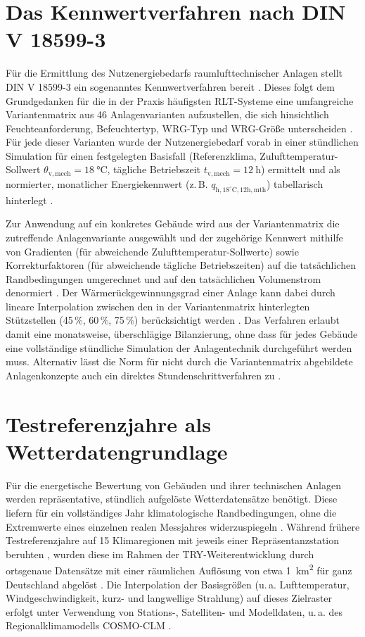 \documentclass{scrreprt}
\begin{document}
\section{Das Kennwertverfahren nach DIN V 18599-3}
Für die Ermittlung des Nutzenergiebedarfs raumlufttechnischer Anlagen
stellt DIN V 18599-3 ein sogenanntes Kennwertverfahren bereit
\parencite{DIN185993}. Dieses folgt dem Grundgedanken für die in der Praxis häufigsten \ac{RLT}-Systeme eine umfangreiche Variantenmatrix aus 46 Anlagenvarianten aufzustellen, die
sich hinsichtlich Feuchteanforderung, Befeuchtertyp,
\ac{WRG}-Typ und \ac{WRG}-Größe unterscheiden \parencite{DIN185993}.
Für jede dieser Varianten wurde der Nutzenergiebedarf vorab in einer
stündlichen Simulation für einen festgelegten Basisfall (Referenzklima,
Zulufttemperatur-Sollwert $\theta_{\mathrm{v,mech}}=\SI{18}{\celsius}$,
tägliche Betriebszeit $t_{\mathrm{v,mech}}=\SI{12}{\hour}$) ermittelt und
als normierter, monatlicher Energiekennwert (z.\,B.
$q_{\mathrm{h,18^\circ C,12h,mth}}$) tabellarisch hinterlegt
\parencite{DIN185993}.

Zur Anwendung auf ein konkretes Gebäude wird aus der Variantenmatrix
die zutreffende Anlagenvariante ausgewählt und der zugehörige
Kennwert mithilfe von Gradienten (für abweichende
Zulufttemperatur-Sollwerte) sowie Korrekturfaktoren (für abweichende
tägliche Betriebszeiten) auf die tatsächlichen Randbedingungen
umgerechnet und auf den tatsächlichen Volumenstrom denormiert
\parencite{DIN185993}. Der Wärmerückgewinnungsgrad einer Anlage kann
dabei durch lineare Interpolation zwischen den in der Variantenmatrix
hinterlegten Stützstellen (45\,\%, 60\,\%, 75\,\%) berücksichtigt
werden \parencite{DIN185993}. Das Verfahren erlaubt damit eine
monatsweise, überschlägige Bilanzierung, ohne dass für jedes Gebäude
eine vollständige stündliche Simulation der Anlagentechnik
durchgeführt werden muss. Alternativ lässt die Norm für nicht durch
die Variantenmatrix abgebildete Anlagenkonzepte auch ein direktes
Stundenschrittverfahren zu \parencite{DIN185993}.

\section{Testreferenzjahre als Wetterdatengrundlage}
Für die energetische Bewertung von Gebäuden und ihrer technischen
Anlagen werden repräsentative, stündlich aufgelöste Wetterdatensätze
benötigt. Diese liefern für ein vollständiges Jahr klimatologische Randbedingungen, ohne die
Extremwerte eines einzelnen realen Messjahres widerzuspiegeln
\parencite{DWDBBR2017}. Während frühere Testreferenzjahre auf 15
Klimaregionen mit jeweils einer Repräsentanzstation beruhten
\parencite[vgl.][]{DIN1859910}, wurden diese im Rahmen der
TRY-Weiterentwicklung durch ortsgenaue Datensätze mit einer
räumlichen Auflösung von etwa \SI{1}{\square\kilo\meter} für ganz
Deutschland abgelöst \parencite{Spekat2011,DWDBBR2017}. Die
Interpolation der Basisgrößen (u.\,a. Lufttemperatur,
Windgeschwindigkeit, kurz- und langwellige Strahlung) auf dieses
Zielraster erfolgt unter Verwendung von Stations-, Satelliten- und
Modelldaten, u.\,a. des Regionalklimamodells COSMO-CLM
\parencite{Krähenmann2016,DWDBBR2017}.
\end{document}
